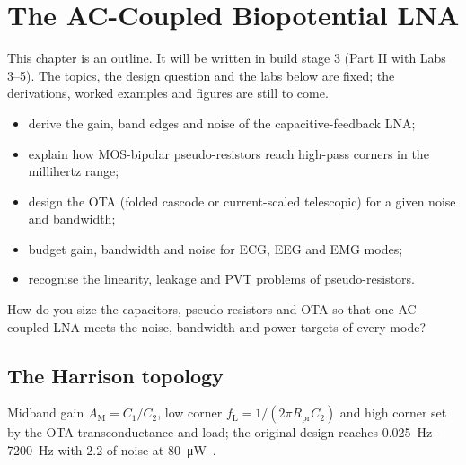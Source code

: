\chapter{The AC-Coupled Biopotential LNA}\label{ch:lna}

\begin{specnote}
This chapter is an outline. It will be written in build stage 3 (Part II with Labs 3--5). The topics, the design question and the labs below are fixed; the derivations, worked examples and figures are still to come.
\end{specnote}

\begin{objectives}
\begin{itemize}
  \item derive the gain, band edges and noise of the capacitive-feedback LNA;
  \item explain how MOS-bipolar pseudo-resistors reach high-pass corners in the millihertz range;
  \item design the OTA (folded cascode or current-scaled telescopic) for a given noise and bandwidth;
  \item budget gain, bandwidth and noise for ECG, EEG and EMG modes;
  \item recognise the linearity, leakage and PVT problems of pseudo-resistors.
\end{itemize}
\end{objectives}

\begin{insight}
How do you size the capacitors, pseudo-resistors and OTA so that one AC-coupled LNA meets the noise, bandwidth and power targets of every \OB{} mode?
\end{insight}

\section{The Harrison topology}\label{sec:ch8-1}
Midband gain $A_\mathrm{M} = C_1/C_2$, low corner $f_\mathrm{L} = 1/(2\pi R_\mathrm{pr} C_2)$ and high corner set by the OTA transconductance and load; the original design reaches \qtyrange{0.025}{7200}{\hertz} with \qty{2.2}{\uVrms} of noise at \qty{80}{\micro\watt}~\cite{harrison2003}.

